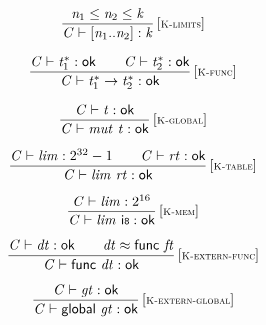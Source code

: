 $$
\begin{array}{@{}c@{}}\displaystyle
\frac{
{\mathit{n}}_{{1}} \leq {\mathit{n}}_{{2}} \leq {\mathit{k}}
}{
{\mathit{C}} \vdash [{\mathit{n}}_{{1}} .. {\mathit{n}}_{{2}}] : {\mathit{k}}
} \, {[\textsc{\scriptsize K{-}limits}]}
\qquad
\end{array}
$$

$$
\begin{array}{@{}c@{}}\displaystyle
\frac{
{\mathit{C}} \vdash {{\mathit{t}}_{{1}}^\ast} : \mathsf{ok}
 \qquad
{\mathit{C}} \vdash {{\mathit{t}}_{{2}}^\ast} : \mathsf{ok}
}{
{\mathit{C}} \vdash {{\mathit{t}}_{{1}}^\ast} \rightarrow {{\mathit{t}}_{{2}}^\ast} : \mathsf{ok}
} \, {[\textsc{\scriptsize K{-}func}]}
\qquad
\end{array}
$$

$$
\begin{array}{@{}c@{}}\displaystyle
\frac{
{\mathit{C}} \vdash {\mathit{t}} : \mathsf{ok}
}{
{\mathit{C}} \vdash {\mathit{mut}}~{\mathit{t}} : \mathsf{ok}
} \, {[\textsc{\scriptsize K{-}global}]}
\qquad
\end{array}
$$

$$
\begin{array}{@{}c@{}}\displaystyle
\frac{
{\mathit{C}} \vdash {\mathit{lim}} : {2^{32}} - 1
 \qquad
{\mathit{C}} \vdash {\mathit{rt}} : \mathsf{ok}
}{
{\mathit{C}} \vdash {\mathit{lim}}~{\mathit{rt}} : \mathsf{ok}
} \, {[\textsc{\scriptsize K{-}table}]}
\qquad
\end{array}
$$

$$
\begin{array}{@{}c@{}}\displaystyle
\frac{
{\mathit{C}} \vdash {\mathit{lim}} : {2^{16}}
}{
{\mathit{C}} \vdash {\mathit{lim}}~\mathsf{i{\scriptstyle8}} : \mathsf{ok}
} \, {[\textsc{\scriptsize K{-}mem}]}
\qquad
\end{array}
$$

\vspace{1ex}

$$
\begin{array}{@{}c@{}}\displaystyle
\frac{
{\mathit{C}} \vdash {\mathit{dt}} : \mathsf{ok}
 \qquad
{\mathit{dt}} \approx \mathsf{func}~{\mathit{ft}}
}{
{\mathit{C}} \vdash \mathsf{func}~{\mathit{dt}} : \mathsf{ok}
} \, {[\textsc{\scriptsize K{-}extern{-}func}]}
\qquad
\end{array}
$$

$$
\begin{array}{@{}c@{}}\displaystyle
\frac{
{\mathit{C}} \vdash {\mathit{gt}} : \mathsf{ok}
}{
{\mathit{C}} \vdash \mathsf{global}~{\mathit{gt}} : \mathsf{ok}
} \, {[\textsc{\scriptsize K{-}extern{-}global}]}
\qquad
\end{array}
$$

